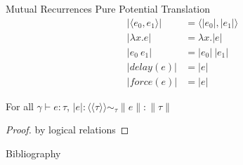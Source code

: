 \documentclass[pdf]{beamer}
\newcommand{\LP}{\langle}
\newcommand{\RP}{\rangle}
\newcommand{\LL}{\langle\!\langle}
\newcommand{\RR}{\rangle\!\rangle}
\begin{document}
\begin{frame}{Mutual Recurrences}
  Pure Potential Translation
    \begin{align*}
      |\LP e_0, e_1 \RP | &= \LP |e_0|, |e_1| \RP                                  \\
      |\lambda x.e | &= \lambda x.|e|                                                              \\
      |e_0\ e_1| &= |e_0|\ |e_1|                                                                   \\
      |delay(e)| &= |e|                                                                            \\
      |force(e)| &= |e|
    \end{align*}
  \begin{theorem}
    For all $\gamma \vdash e : \tau$, $|e| : \LL \tau \RR \sim_\tau \|e\| : \|\tau\|$
  \end{theorem}
  \begin{proof}
    by logical relations
  \end{proof}
\end{frame}


\begin{frame}{Bibliography}
  
  
\end{frame}
\end{document}
